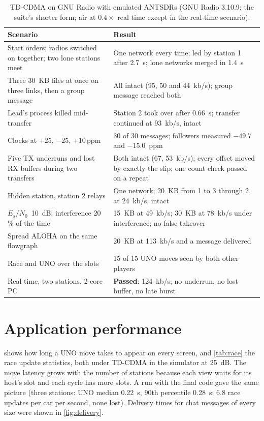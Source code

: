 \documentclass[11pt,a4paper,oneside]{report}
\newcommand{\EsNo}{\ensuremath{E_s/N_0}}
\begin{document}
\begin{table}[htbp]
\centering\small
\caption{TD-CDMA on GNU Radio with emulated ANTSDRs (GNU Radio 3.10.9; the suite's shorter form; air at
$0.4\times$ real time except in the real-time scenario).}\label{tab:fake}
\begin{tabularx}{\linewidth}{@{}>{\raggedright\arraybackslash}p{55mm}L@{}}
\toprule
\textbf{Scenario} & \textbf{Result}\\
\midrule
Start orders; radios switched on together; two lone stations meet & One network every time; led by station 1 after \SI{2.7}{s}; lone networks merged in \SI{1.4}{s}\\
Three \SI{30}{KB} files at once on three links, then a group message & All intact (95, 50 and \SI{44}{kb/s}); group message reached both\\
Lead's process killed mid-transfer & Station 2 took over after \SI{0.66}{s}; transfer continued at \SI{93}{kb/s}, intact\\
Clocks at $+25$, $-25$, $+10$\,ppm & 30 of 30 messages; followers measured $-49.7$ and \SI{-15.0}{ppm}\\
Five TX underruns and lost RX buffers during two transfers & Both intact (67, \SI{53}{kb/s}); every offset moved by exactly the slip; one count check passed on a repeat\\
Hidden station, station 2 relays & One network; \SI{20}{KB} from 1 to 3 through 2 at \SI{24}{kb/s}, intact\\
\EsNo\ \SI{10}{dB}; interference 20\,\% of the time & \SI{15}{KB} at \SI{49}{kb/s}; \SI{30}{KB} at \SI{78}{kb/s} under interference; no false takeover\\
Spread ALOHA on the same flowgraph & \SI{20}{KB} at \SI{113}{kb/s} and a message delivered\\
Race and UNO over the slots & 15 of 15 UNO moves seen by both other players\\
Real time, two stations, 2-core PC & \textbf{Passed}: \SI{124}{kb/s}; no underrun, no lost buffer, no late burst\\
\bottomrule
\end{tabularx}
\end{table}

\section{Application performance}
 shows how long a UNO move takes to appear on every screen, and \cref{tab:race} the race
update statistics, both under TD-CDMA in the simulator at \SI{25}{dB}. The move latency grows with the
number of stations because each view waits for its host's slot and each cycle has more slots. A run with
the final code gave the same picture (three stations: UNO median \SI{0.22}{s}, 90th percentile
\SI{0.28}{s}; 6.8 race updates per car per second, none lost). Delivery times for chat messages of every
size were shown in \cref{fig:delivery}.
\end{document}
